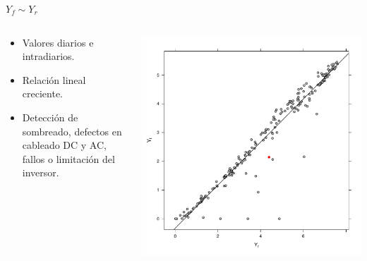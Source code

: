 \documentclass[aspectratio=169, usenames,svgnames,dvipsnames]{beamer}
\begin{document}
\begin{frame}[label={sec:orge252cec}]{\(Y_f \sim Y_r\)}
\begin{columns}
\begin{column}{0.3\columnwidth}
\begin{itemize}
\item Valores diarios e intradiarios.
\item Relación lineal creciente.
\item Detección de sombreado, defectos en cableado DC y AC, fallos o limitación del inversor.
\end{itemize}
\end{column}

\begin{column}{0.7\columnwidth}
\begin{center}
\includegraphics[height=0.95\textheight]{../figs/YfYr.pdf}
\end{center}
\end{column}
\end{columns}
\end{frame}
\end{document}
